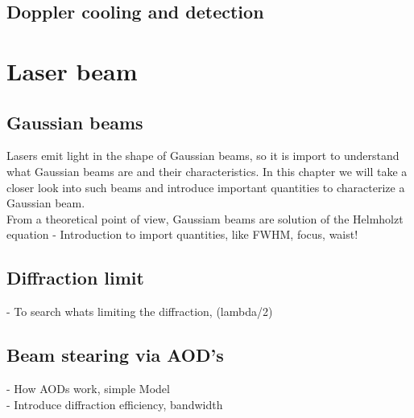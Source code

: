 \subsection{Doppler cooling and detection}
\section{Laser beam}
\subsection{Gaussian beams}
Lasers emit light in the shape of Gaussian beams, so it is import to understand what Gaussian beams are and their characteristics. In this chapter we will take a closer look into such beams and introduce important quantities to characterize a Gaussian beam. \\
From a theoretical point of view, Gaussiam beams are solution of the Helmholzt equation
\cite{saleh}
- Introduction to import quantities, like FWHM, focus, waist!
\subsection{Diffraction limit}
- To search whats limiting the diffraction, (lambda/2)
\subsection{Beam stearing via AOD's}
- How AODs work, simple Model\\
- Introduce diffraction efficiency, bandwidth
